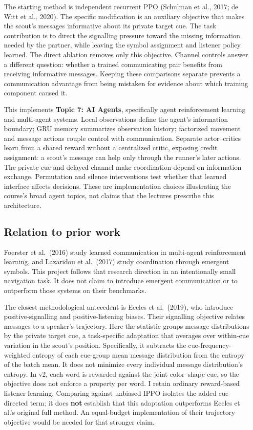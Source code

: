 The starting method is independent recurrent PPO (Schulman et al., 2017;
de Witt et al., 2020). The specific modification is an auxiliary
objective that makes the scout's messages informative about its private
target cue. The task contribution is to direct the signalling pressure
toward the missing information needed by the partner, while leaving the
symbol assignment and listener policy learned. The direct ablation
removes only this objective. Channel controls answer a different
question: whether a trained communicating pair benefits from receiving
informative messages. Keeping these comparisons separate prevents a
communication advantage from being mistaken for evidence about which
training component caused it.

This implements \textbf{Topic 7: AI Agents}, specifically agent
reinforcement learning and multi-agent systems. Local observations
define the agent's information boundary; GRU memory summarizes
observation history; factorized movement and message actions couple
control with communication. Separate actor--critics learn from a shared
reward without a centralized critic, exposing credit assignment: a
scout's message can help only through the runner's later actions. The
private cue and delayed channel make coordination depend on information
exchange. Permutation and silence interventions test whether that
learned interface affects decisions. These are implementation choices
illustrating the course's broad agent topics, not claims that the
lectures prescribe this architecture.

\subsection{Relation to prior work}\label{relation-to-prior-work}

Foerster et al.~(2016) study learned communication in multi-agent
reinforcement learning, and Lazaridou et al.~(2017) study coordination
through emergent symbols. This project follows that research direction
in an intentionally small navigation task. It does not claim to
introduce emergent communication or to outperform those systems on their
benchmarks.

The closest methodological antecedent is Eccles et al.~(2019), who
introduce positive-signalling and positive-listening biases. Their
signalling objective relates messages to a speaker's trajectory. Here
the statistic groups message distributions by the private target cue, a
task-specific adaptation that averages over within-cue variation in the
scout's position. Specifically, it subtracts the cue-frequency-weighted
entropy of each cue-group mean message distribution from the entropy of
the batch mean. It does not minimize every individual message
distribution's entropy. In v2, each word is rewarded against the joint
color--shape cue, so the objective does not enforce a property per word.
I retain ordinary reward-based listener learning. Comparing against
unbiased IPPO isolates the added cue-directed term; it does \textbf{not}
establish that this adaptation outperforms Eccles et al.'s original full
method. An equal-budget implementation of their trajectory objective
would be needed for that stronger claim.

